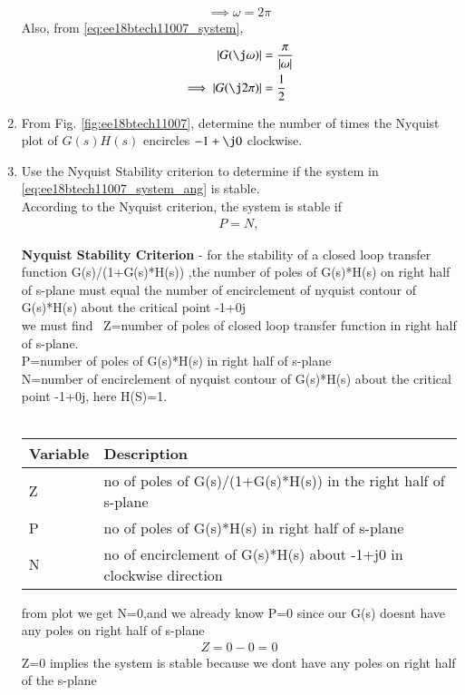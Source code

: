 \begin{enumerate}[label=\thesection.\arabic*.,ref=\thesection.\theenumi]
\begin{align}
\\
\implies \omega = 2\pi
\end{align}
Also, from \eqref{eq:ee18btech11007_system},
\begin{align}
\label{eq:ee18btech11007_system_mod}
\abs{ G(\j\omega)}&=\frac{\pi }{\abs{\omega}}
\\
\implies \abs{ G(\j2\pi)} &= \frac{1}{2}
\end{align}
%
\item From Fig.  \ref{fig:ee18btech11007}, determine the number of times the Nyquist plot of $G(s)H(s)$ encircles $-1+\j0$ clockwise.
%
\item Use the Nyquist Stability criterion to determine if the system in \eqref{eq:ee18btech11007_system_ang} is stable.
\\
\solution According to the Nyquist criterion, the system is stable if
\begin{align}
P=N,    
\end{align}

 \textbf{Nyquist Stability Criterion} - for  the stability of a closed loop transfer function G(s)/(1+G(s)*H(s)) ,the number of poles of G(s)*H(s) on right half of s-plane must equal the number of encirclement of nyquist contour of  G(s)*H(s) about the critical point -1+0j
\\
 we must find
\
Z=number of poles of closed loop transfer function in right half of s-plane.
\\ 
 P=number of poles of G(s)*H(s) in right half of s-plane
\\ 
 N=number of encirclement of nyquist contour of G(s)*H(s) about the critical point -1+0j,
here H(S)=1.
\\ 
\
\begin{tabular}{ |p{4cm}||p{4cm}|  }
 \hline
 
 \hline
 Variable&Description\\
 \hline
 Z&no of poles of G(s)/(1+G(s)*H(s)) in the right half of s-plane\\
 \hline
 P&no of poles of G(s)*H(s) in right half of s-plane \\
 \hline
 N&no of encirclement of G(s)*H(s) about -1+j0 in clockwise direction\\
 
 \hline
\end{tabular}
 from plot we get N=0,and we already know P=0 since our G(s) doesnt have any poles on right half of s-plane
\begin{align}
Z=0-0=0
\end{align}
Z=0 implies the system is stable because we dont have any poles on right half of the s-plane



\end{enumerate}
